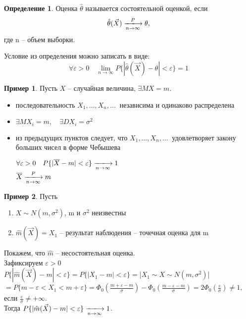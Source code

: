 \documentclass[a4paper, 12pt]{article}
\theoremstyle{definition}
\newtheorem{definition}{Определение}[section]
\theoremstyle{leads}
\theoremstyle{example}
\newtheorem{example}{Пример}
\newcommand{\infseq}[3]{%
	\ensuremath{#1_#2, \dots, #1_#3, \dots}\ }
\newcommand{\infseqX}{%
	\infseq{X}{1}{n}}
\begin{document}
\begin{definition}
	Оценка $\hat{\theta}$ называется состоятельной оценкой, если 
	\begin{displaymath}
		\hat \theta (\vec{X}) \xlongrightarrow[n \rightarrow \infty]{P} \theta, 
	\end{displaymath} 
	где n -- объем выборки.
\end{definition}
\begin{remark}
	Условие из определения можно записать в виде: 
	\begin{displaymath}
		\forall \varepsilon > 0 \quad \lim_{n \rightarrow \infty} P\{|\hat{\theta}(\vec{X}) - \theta| < \varepsilon\} = 1
	\end{displaymath}
\end{remark}
\begin{example}
Пусть $X$ -- случайная величина, $\exists MX = m$.
	\begin{itemize}
		\item последовательность $\infseqX$ независима и одинаково распределена
		\item $\exists MX_i = m, \quad \exists DX_i = \sigma^2$
		\item из предыдущих пунктов следует, что $\infseqX$ удовлетворяет закону больших чисел в форме Чебышева
		\begin{center}
			\centering
			$\forall \varepsilon > 0 \quad P\{| \overline{X} - m | < \varepsilon \} \xlongrightarrow[n \rightarrow \infty]{} 1$\\
			$ \overline{X} \xlongrightarrow[n \rightarrow \infty]{P} m$
		\end{center}
	\end{itemize}
\end{example}

\begin{example}
	Пусть
	\begin{enumerate}
		\item $X \sim N(m, \sigma^2)$, m и $\sigma^2$ неизвестны
		\item $\hat{m}(\vec{X}) = X_1$ -- результат наблюдения -- точечная оценка для m
	\end{enumerate}
Покажем, что $\hat{m}$ -- несостоятельная оценка.\\
Зафиксируем $\varepsilon > 0$ \\
$P\{|\hat{m}(\vec{X}) - m| < \varepsilon\} = P\{|X_1 - m| < \varepsilon\} = $|$X_1 \sim X \sim N(m, \sigma^2)$|$ = P\{m - \varepsilon < X_1 < m + \varepsilon\} = \Phi_0(\frac{m + \varepsilon - m}{\sigma}) - \Phi_0(\frac{m - \varepsilon - m}{\sigma}) = 2\Phi_0(\frac{\varepsilon}{\sigma}) \neq 1, $ если $\frac{\varepsilon}{\sigma} \neq +\infty$.\\
Тогда $P\{|\hat{m}(\vec{X}) - m| < \varepsilon\} \xlongrightarrow[n \rightarrow \infty]{} 1$.
\end{example}
\end{document}
